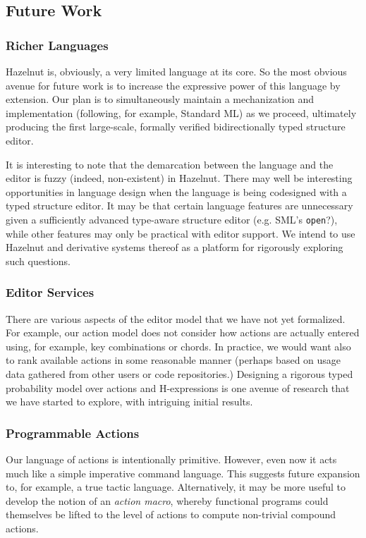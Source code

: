 \documentclass[preprint,9pt]{sigplanconf}
\begin{document}
\subsection{Future Work}
\subsubsection{Richer Languages}
Hazelnut is, obviously, a very limited language at its core. So the most
obvious avenue for future work is to increase the expressive power of this
language by extension. Our plan is to simultaneously maintain a
mechanization and implementation (following, for example, Standard ML) as
we proceed, ultimately producing the first large-scale, formally verified
bidirectionally typed structure editor.

It is interesting to note that the demarcation between the language and the
editor is fuzzy (indeed, non-existent) in Hazelnut. There may well be
interesting opportunities in language design when the language is being
codesigned with a typed structure editor. It may be that certain language
features are unnecessary given a sufficiently advanced type-aware structure
editor (e.g. SML's \texttt{open}?), while other features may only be
practical with editor support. We intend to use Hazelnut and derivative
systems thereof as a platform for rigorously exploring such questions.

\subsubsection{Editor Services}
There are various aspects of the editor model that we have not yet
formalized. For example, our action model does not consider how actions are
actually entered using, for example, key combinations or chords. In
practice, we would want also to rank available actions in some reasonable
manner (perhaps based on usage data gathered from other users or code
repositories.) Designing a rigorous typed probability model over actions
and H-expressions is one avenue of research that we have started to
explore, with intriguing initial results.

\subsubsection{Programmable Actions}
Our language of actions is intentionally primitive. However, even now it
acts much like a simple imperative command language. This suggests future
expansion to, for example, a true tactic language. Alternatively, it may be
more useful to develop the notion of an \emph{action macro}, whereby
functional programs could themselves be lifted to the level of actions to
compute non-trivial compound actions.
\end{document}
